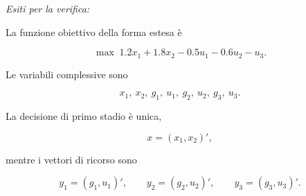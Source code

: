 \begin{exercise}
\begin{enumerate}
\end{enumerate}

\medskip

\noindent
\textit{Esiti per la verifica:}

La funzione obiettivo della forma estesa \`e

\[
\max\;
1.2x_1+1.8x_2
-
0.5u_1
-
0.6u_2
-
u_3.
\]

Le variabili complessive sono

\[
x_1,\ x_2,\ g_1,\ u_1,\ g_2,\ u_2,\ g_3,\ u_3.
\]

La decisione di primo stadio \`e unica,

\[
x=(x_1,x_2)',
\]

\noindent mentre i vettori di ricorso sono

\[
y_1=(g_1,u_1)',
\qquad
y_2=(g_2,u_2)',
\qquad
y_3=(g_3,u_3)'.
\]

\end{exercise}


